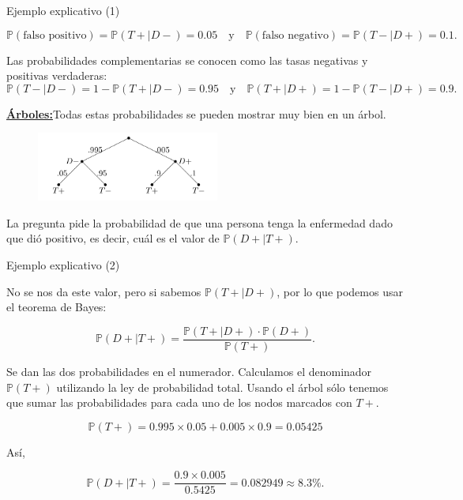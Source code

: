 \documentclass[10pt]{beamer}
\begin{document}
\begin{frame}{Ejemplo explicativo (1)}
\small{	
\[
\mathbb{P}(\text{falso positivo}) = \mathbb{P}(T+|D-) = 0.05\quad \text{y}\quad \mathbb{P}(\text{falso negativo}) = \mathbb{P}(T-|D+) = 0.1.
\]
		
Las probabilidades complementarias se conocen como las  tasas negativas y  positivas verdaderas:
\[
\mathbb{P}(T-|D-) = 1 - \mathbb{P}(T+|D-) = 0.95 \quad \text{y}\quad   \mathbb{P}(T+|D+) = 1 - \mathbb{P}(T-|D+) = 0.9.
\]	
}
\underline{\textbf{\'Arboles:}}Todas estas probabilidades se pueden mostrar muy bien en un \'arbol.

\begin{figure}[h]
	\centering
	\includegraphics[width=6cm]{g7}
\end{figure}
La pregunta pide la probabilidad de que una persona tenga la enfermedad dado que  di\'o positivo, es decir, cu\'al es el valor de $\mathbb{P}(D+ | T +)$.
\end{frame}
\begin{frame}{Ejemplo explicativo (2)}
\small{ No se nos da este valor, pero si sabemos $\mathbb{P}(T+|D +)$, por lo que podemos usar el teorema de Bayes:

\[
\mathbb{P}(D+|T +) = \frac{\mathbb{P}(T+|D +)\cdot \mathbb{P}(D+ )}{\mathbb{P}(T+)}.
\]

Se dan las dos probabilidades en el numerador. Calculamos el denominador $\mathbb{P}(T +)$ utilizando la ley de probabilidad total. Usando el \'arbol s\'olo tenemos que sumar las probabilidades para cada uno de los nodos marcados con $T+$.

\[
\mathbb{P}(T +) = 0.995 \times 0.05 + 0.005 \times  0.9 = 0.05425
\]

As\'i,

\[
\mathbb{P}(D+|T +) = \frac{0.9 \times 0.005}{0.5425} = 0.082949 \approx 8.3\%.
\]	
}
\end{frame}
\end{document}
